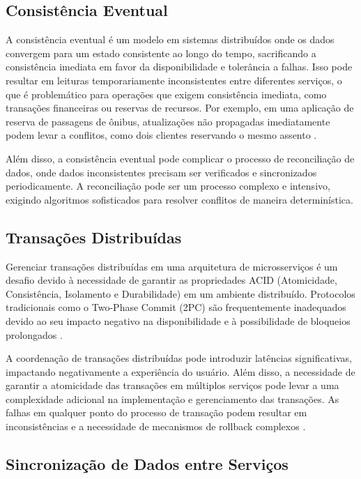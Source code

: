 \subsection{Consistência Eventual}

A consistência eventual é um modelo em sistemas distribuídos onde os dados convergem para um estado consistente ao longo do tempo, sacrificando a consistência imediata em favor da disponibilidade e tolerância a falhas. Isso pode resultar em leituras temporariamente inconsistentes entre diferentes serviços, o que é problemático para operações que exigem consistência imediata, como transações financeiras ou reservas de recursos. Por exemplo, em uma aplicação de reserva de passagens de ônibus, atualizações não propagadas imediatamente podem levar a conflitos, como dois clientes reservando o mesmo assento \cite{vogels2009}.

Além disso, a consistência eventual pode complicar o processo de reconciliação de dados, onde dados inconsistentes precisam ser verificados e sincronizados periodicamente. A reconciliação pode ser um processo complexo e intensivo, exigindo algoritmos sofisticados para resolver conflitos de maneira determinística.

\subsection{Transações Distribuídas}

Gerenciar transações distribuídas em uma arquitetura de microsserviços é um desafio devido à necessidade de garantir as propriedades ACID (Atomicidade, Consistência, Isolamento e Durabilidade) em um ambiente distribuído. Protocolos tradicionais como o Two-Phase Commit (2PC) são frequentemente inadequados devido ao seu impacto negativo na disponibilidade e à possibilidade de bloqueios prolongados \cite{silberschatz2020}.

A coordenação de transações distribuídas pode introduzir latências significativas, impactando negativamente a experiência do usuário. Além disso, a necessidade de garantir a atomicidade das transações em múltiplos serviços pode levar a uma complexidade adicional na implementação e gerenciamento das transações. As falhas em qualquer ponto do processo de transação podem resultar em inconsistências e a necessidade de mecanismos de rollback complexos \cite{gray2006}.

\subsection{Sincronização de Dados entre Serviços}

